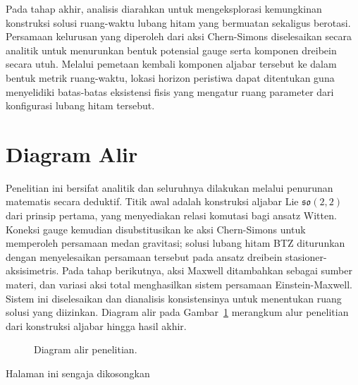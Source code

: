 Pada tahap akhir, analisis diarahkan untuk mengeksplorasi kemungkinan konstruksi solusi ruang-waktu lubang hitam yang bermuatan sekaligus berotasi. Persamaan kelurusan yang diperoleh dari aksi Chern-Simons diselesaikan secara analitik untuk menurunkan bentuk potensial gauge serta komponen dreibein secara utuh. Melalui pemetaan kembali komponen aljabar tersebut ke dalam bentuk metrik ruang-waktu, lokasi horizon peristiwa dapat ditentukan guna menyelidiki batas-batas eksistensi fisis yang mengatur ruang parameter dari konfigurasi lubang hitam tersebut.

\section{Diagram Alir}

Penelitian ini bersifat analitik dan seluruhnya dilakukan melalui penurunan matematis secara deduktif. Titik awal adalah konstruksi aljabar Lie $\mathfrak{so}(2,2)$ dari prinsip pertama, yang menyediakan relasi komutasi bagi ansatz Witten. Koneksi gauge kemudian disubstitusikan ke aksi Chern-Simons untuk memperoleh persamaan medan gravitasi; solusi lubang hitam BTZ diturunkan dengan menyelesaikan persamaan tersebut pada ansatz dreibein stasioner-aksisimetris. Pada tahap berikutnya, aksi Maxwell ditambahkan sebagai sumber materi, dan variasi aksi total menghasilkan sistem persamaan Einstein-Maxwell. Sistem ini diselesaikan dan dianalisis konsistensinya untuk menentukan ruang solusi yang diizinkan. Diagram alir pada Gambar~\ref{fig:DiagramAlir} merangkum alur penelitian dari konstruksi aljabar hingga hasil akhir.

\begin{figure}[H]
    \centering
    \caption{Diagram alir penelitian.}
    \label{fig:DiagramAlir}
\end{figure}

\newpage
\thispagestyle{empty}
\vspace*{\fill}
    \begin{center}
        Halaman ini sengaja dikosongkan
    \end{center}
\vspace*{\fill}
\pagebreak